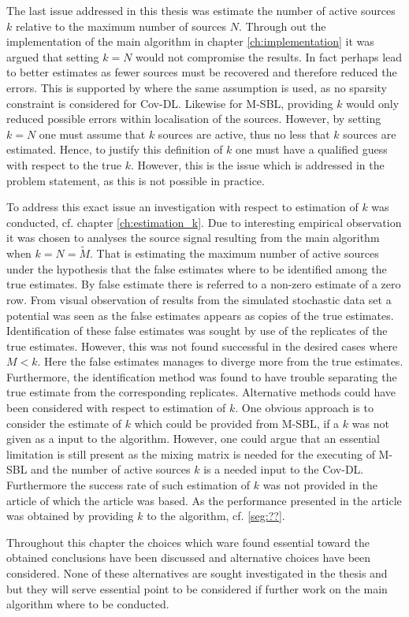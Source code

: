 The last issue addressed in this thesis was estimate the number of active sources $k$ relative to the maximum number of sources $N$. Through out the implementation of the main algorithm in chapter \ref{ch:implementation} it was argued that setting $k = N$ would not compromise the results. 
In fact perhaps lead to better estimates as fewer sources must be recovered and therefore reduced the errors.
This is supported by \cite{cov} where the same assumption is used, as no sparsity constraint is considered for Cov-DL. 
Likewise for M-SBL, providing $k$ would only reduced possible errors within localisation of the sources.
However, by setting $k = N$ one must assume that $k$ sources are active, thus no less that $k$ sources are estimated. 
Hence, to justify this definition of $k$ one must have a qualified guess with respect to the true $k$. 
However, this is the issue which is addressed in the problem statement, as this is not possible in practice. 

To address this exact issue an investigation with respect to estimation of $k$ was conducted, cf. chapter \ref{ch:estimation_k}. 
Due to interesting empirical observation it was chosen to analyses the source signal resulting from the main algorithm when $k = N = \widetilde{M}$. 
That is estimating the maximum number of active sources under the hypothesis that the false estimates where to be identified among the true estimates. By false estimate there is referred to a non-zero estimate of a zero row. 
From visual observation of results from the simulated stochastic data set a potential was seen as the false estimates appears as copies of the true estimates. 
Identification of these false estimates was sought by use of the replicates of the true estimates.
However, this was not found successful in the desired cases where $M<k$. 
Here the false estimates manages to diverge more from the true estimates. 
Furthermore, the identification method was found to have trouble separating the true estimate from the corresponding replicates.
Alternative methods could have been considered with respect to estimation of $k$. 
One obvious approach is to consider the estimate of $k$ which could be provided from M-SBL, if a $k$ was not given as a input to the algorithm. 
However, one could argue that an essential limitation is still present as the mixing matrix is needed for the executing of M-SBL and the number of active sources $k$ is a needed input to the Cov-DL. Furthermore the success rate of such estimation of $k$ was not provided in the article  \cite{M-SBL} of which the article was based. As the performance presented in the article was obtained by providing $k$ to the algorithm, cf. \ref{seg:??}.   

Throughout this chapter the choices which ware found essential toward the obtained conclusions have been discussed and alternative choices have been considered.  
None of these alternatives are sought investigated in the thesis and but they will serve essential point to be considered if further work on the main algorithm where to be conducted.


      
        


       
 
